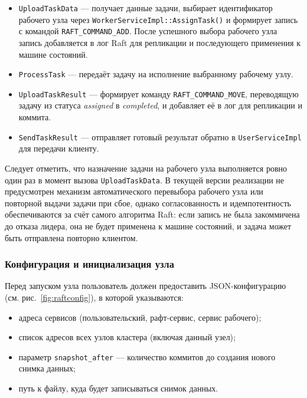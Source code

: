 \begin{itemize}
    \item \texttt{UploadTaskData} — получает данные задачи, выбирает
    идентификатор рабочего узла через \texttt{WorkerServiceImpl::AssignTask()}
    и формирует запись с командой \texttt{RAFT\_COMMAND\_ADD}.
    После успешного выбора рабочего узла запись добавляется в лог Raft
    для репликации и последующего применения к машине состояний.
    \item \texttt{ProcessTask} — передаёт задачу на исполнение выбранному рабочему узлу.
    \item \texttt{UploadTaskResult} — формирует команду
    \texttt{RAFT\_COMMAND\_MOVE}, переводящую задачу из статуса
    \emph{assigned} в \emph{completed}, и добавляет её в лог для
    репликации и коммита.
    \item \texttt{SendTaskResult} — отправляет готовый результат
    обратно в \texttt{UserServiceImpl} для передачи клиенту.
\end{itemize}

Следует отметить, что назначение задачи на рабочего узла выполняется ровно один раз в
момент вызова \texttt{UploadTaskData}. В текущей версии реализации не
предусмотрен механизм автоматического перевыбора рабочего узла или повторной выдачи
задачи при сбое, однако согласованность и идемпотентность обеспечиваются за
счёт самого алгоритма Raft: если запись не была закоммичена до отказа лидера,
она не будет применена к машине состояний, и задача может быть отправлена
повторно клиентом.

\subsubsection{Конфигурация и инициализация узла}

Перед запуском узла пользователь должен предоставить
JSON-конфигурацию (см. рис.~\ref{fig:raftconfig}), в которой указываются:
\begin{itemize}
    \item адреса сервисов (пользовательский, рафт-сервис, сервис рабочего);
    \item список адресов всех узлов кластера (включая данный узел);
    \item параметр \texttt{snapshot\_after} — количество коммитов
    до создания нового снимка данных;
    \item путь к файлу, куда будет записываться снимок данных.
\end{itemize}

